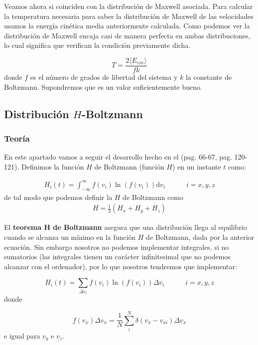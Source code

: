 \documentclass[11pt]{article} %
\newcommand{\parentesis}[1]{\left( #1  \right)}
\newcommand{\D}{\mathrm{d}}
\newcommand{\tquad}{\quad \quad \quad}
\begin{document}
Veamos ahora si coinciden con la distribución de Maxwell asociada. Para calcular la temperatura necesaria para saber la distribución de Maxwell de las velocidades usamos la energía cinética media anteriormente calculada. Como podemos ver la distribución de Maxwell encaja casi de manera perfecta en ambas distribuciones, lo cual significa que verifican la condición previamente dicha.

\begin{equation}
	T = \frac{2\langle E_{cin} \rangle}{fk}
\end{equation}
donde $f$ es el número de grados de libertad del sistema y $k$ la constante de Boltzmann. Supondremos que es un valor suficientemente bueno.

	
\subsection{Distribución $H$-Boltzmann} 	
\subsubsection{Teoría}

En este apartado vamos a seguir el desarrollo hecho en el \cite{Haile} (pag. 66-67, pag. 120-121). Definimos la función $H$ de Boltzmann (función $H$) en un instante $t$ como:

\begin{eqnarray}
	H_i(t) = \int_{-\infty}^{\infty} f(v_i) \ln (f(v_i)) \D v_i \tquad i = x,y,z
\end{eqnarray} 
de tal modo que podemos definir la $H$ de Boltzmann como
\begin{eqnarray}
	H=\frac{1}{3} \parentesis{H_x+H_y+H_z}
\end{eqnarray}

El \textbf{teorema H de Boltzmann} asegura que una distribución llega al equilibrio cuando se alcanza un mínimo en la función $H$ de Boltzmann, dada por la anterior ecuación. Sin embargo nosotros no podemos implementar integrales, si no sumatorios (las integrales tienen un carácter infinitesimal que no podemos alcanzar con el ordenador), por lo que nosotros tendremos que implementar:

\begin{equation}
	H_i (t) = \sum_{\Delta v_i} f(v_i) \ln (f(v_i)) \Delta v_i  \tquad i=x,y,z
\end{equation}
donde

\begin{equation}
	f(v_x) \Delta v_x = \frac{1}{N} \sum_i^N \delta (v_x-v_{xi}) \Delta v_x
\end{equation}
e igual para $v_y$ e $v_z$. 
\end{document}
